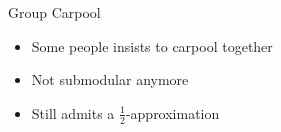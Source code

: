 \begin{frame}{Group Carpool}
\begin{itemize}[<+>]
  \item Some people insists to carpool together
  \item \alert{Not} submodular anymore
  \item Still admits a $\frac{1}{2}$-approximation
\end{itemize}
\end{frame}